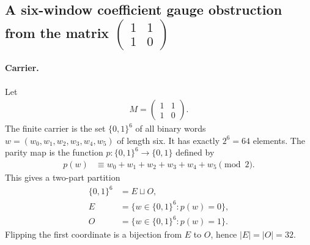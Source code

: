 
\subsection{A six-window coefficient gauge obstruction from the matrix $\begin{pmatrix}1&1\\1&0\end{pmatrix}$}
\label{sec:window6-lucas-kernel-coefficient-gauge-obstruction-certificate}

\paragraph{Carrier.}
Let
$$
\begin{aligned}
M=\begin{pmatrix}1&1\\1&0\end{pmatrix}.
\end{aligned}
$$
The finite carrier is the set $\{0,1\}^6$ of all binary words $w=(w_0,w_1,w_2,w_3,w_4,w_5)$ of length six.  It has exactly $2^6=64$ elements.  The parity map is the function $p:\{0,1\}^6\to\{0,1\}$ defined by
$$
\begin{aligned}
p(w)&\equiv w_0+w_1+w_2+w_3+w_4+w_5 \pmod 2.
\end{aligned}
$$
This gives a two-part partition
$$
\begin{aligned}
\{0,1\}^6 &= E\sqcup O,\\
E&=\{w\in\{0,1\}^6:p(w)=0\},\\
O&=\{w\in\{0,1\}^6:p(w)=1\}.
\end{aligned}
$$
Flipping the first coordinate is a bijection from $E$ to $O$, hence $|E|=|O|=32$.

